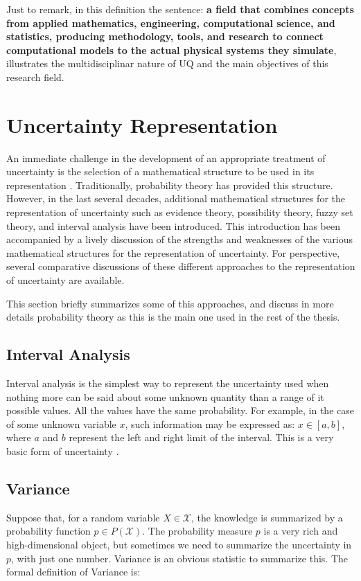 Just to remark, in this definition the sentence: \textbf{a field that combines concepts from applied mathematics, engineering, computational science, and statistics, producing methodology, tools, and research to connect computational models to the actual physical systems they simulate}, illustrates the multidisciplinar nature of UQ and the main objectives of this research field.


\section{Uncertainty Representation}\label{sec:uncertainty_representation}

An immediate challenge in the development of an appropriate treatment of uncertainty is the selection of a mathematical structure to be used in its representation \cite{Helton2010}. Traditionally, probability theory has provided this structure. However, in the last several decades, additional mathematical structures for the representation of uncertainty such as evidence theory, possibility theory, fuzzy set theory, and interval analysis have been introduced.
This introduction has been accompanied by a lively discussion of the strengths and weaknesses of the various mathematical structures for the representation of uncertainty. For perspective, several comparative discussions of these different approaches to the representation of uncertainty are available.


This section briefly summarizes some of this approaches, and discuss in more details probability theory as this is the main one used in the rest of the thesis.

\subsection{Interval Analysis}
Interval analysis is the simplest way to represent the uncertainty used when nothing more can be said about some unknown quantity than a range of it possible values. All the values have the same probability. For example, in the case of some unknown variable $x$, such information may be expressed as: $x \in [a, b]$, where $a$ and $b$ represent the left and right limit of the interval. This is a very basic form of uncertainty \cite{Sullivan2015}.

\subsection{Variance}
Suppose that, for a random variable $X \in \mathcal{X}$, the knowledge is summarized by a probability function $p \in P(\mathcal{X})$. The probability measure $p$ is a very rich and high-dimensional object, but sometimes we need to summarize the uncertainty in $p$, with just one number. Variance is an obvious statistic to summarize this. The formal definition of Variance is:

